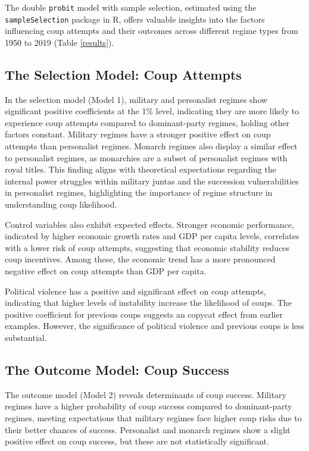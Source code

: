 \documentclass[
  12pt,
]{report}
\begin{document}
The double \texttt{probit} model with sample selection, estimated using
the \texttt{sampleSelection} package in R, offers valuable insights into
the factors influencing coup attempts and their outcomes across
different regime types from 1950 to 2019 (Table \ref{results}).

\subsection{The Selection Model: Coup
Attempts}\label{the-selection-model-coup-attempts}

In the selection model (Model 1), military and personalist regimes show
significant positive coefficients at the 1\% level, indicating they are
more likely to experience coup attempts compared to dominant-party
regimes, holding other factors constant. Military regimes have a
stronger positive effect on coup attempts than personalist regimes.
Monarch regimes also display a similar effect to personalist regimes, as
monarchies are a subset of personalist regimes with royal titles. This
finding aligns with theoretical expectations regarding the internal
power struggles within military juntas and the succession
vulnerabilities in personalist regimes, highlighting the importance of
regime structure in understanding coup likelihood.

Control variables also exhibit expected effects. Stronger economic
performance, indicated by higher economic growth rates and GDP per
capita levels, correlates with a lower risk of coup attempts, suggesting
that economic stability reduces coup incentives. Among these, the
economic trend has a more pronounced negative effect on coup attempts
than GDP per capita.

Political violence has a positive and significant effect on coup
attempts, indicating that higher levels of instability increase the
likelihood of coups. The positive coefficient for previous coups
suggests an copycat effect from earlier examples. However, the
significance of political violence and previous coups is less
substantial.

\subsection{The Outcome Model: Coup
Success}\label{the-outcome-model-coup-success}

The outcome model (Model 2) reveals determinants of coup success.
Military regimes have a higher probability of coup success compared to
dominant-party regimes, meeting expectations that military regimes face
higher coup risks due to their better chances of success. Personalist
and monarch regimes show a slight positive effect on coup success, but
these are not statistically significant.
\end{document}
